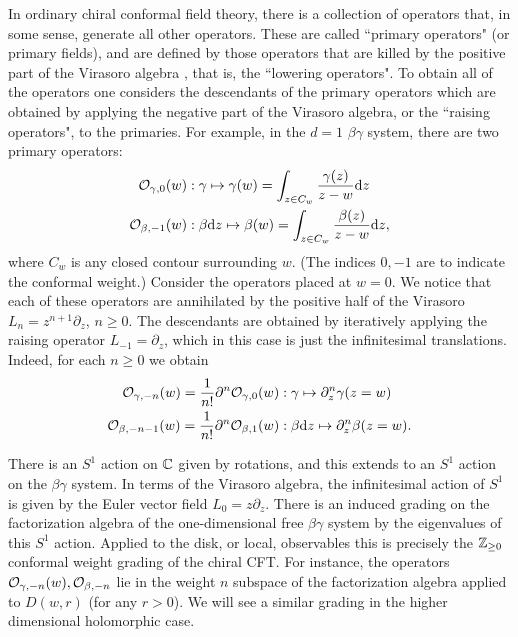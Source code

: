 \documentclass[10pt]{amsart}
\begin{document}
In ordinary chiral conformal field theory, there is a collection of operators that, in some sense, generate all other operators. 
These are called ``primary operators" (or primary fields), and are defined by those operators that are killed by the positive part of the Virasoro algebra \cite{polchinski}, that is, the ``lowering operators". 
To obtain all of the operators one considers the descendants of the primary operators which are obtained by applying the negative part of the Virasoro algebra, or the ``raising operators", to the primaries. 
For example, in the $d=1$ $\beta\gamma$ system, there are two primary operators:
\begin{align*}
\mathcal O_{\gamma,0} (w) & : \gamma \mapsto \gamma(w) = \int_{z \in C_w} \frac{\gamma(z)}{z-w} {\rm d} z  \\
\mathcal O_{\beta,-1} (w) & : \beta {\rm d} z \mapsto \beta(w) = \int_{z \in C_w} \frac{\beta(z)}{z-w} {\rm d} z ,
\end{align*}
where $C_w$ is any closed contour surrounding $w$. 
(The indices $0,-1$ are to indicate the conformal weight.)
Consider the operators placed at $w=0$.
We notice that each of these operators are annihilated by the positive half of the Virasoro $L_n = z^{n+1} \partial_z$, $n \geq 0$.
The descendants are obtained by iteratively applying the raising operator $L_{-1} = \partial_z$, which in this case is just the infinitesimal translations. 
Indeed, for each $n \geq 0$ we obtain
\begin{align*}
\mathcal O_{\gamma,-n}(w) = \frac{1}{n!} \partial^n \mathcal O_{\gamma,0}(w) & : \gamma \mapsto \partial_z^n \gamma(z = w) \\
\mathcal O_{\beta,-n-1}(w) = \frac{1}{n!} \partial^n \mathcal O_{\beta,1}(w) & : \beta {\rm d} z \mapsto \partial_z^n \beta(z=w) .
\end{align*}

There is an $S^1$ action on $\mathbb C$ given by rotations, and this extends to an $S^1$ action on the $\beta\gamma$ system.
In terms of the Virasoro algebra, the infinitesimal action of $S^1$ is given by the Euler vector field $L_0 = z \partial_z$. 
There is an induced grading on the factorization algebra of the one-dimensional free $\beta\gamma$ system by the eigenvalues of this $S^1$ action.
Applied to the disk, or local, observables this is precisely the $\mathbb Z_{\geq 0}$ conformal weight grading of the chiral CFT.
For instance, the operators $\mathcal O_{\gamma,-n}(w), \mathcal O_{\beta, -n}$ lie in the weight $n$ subspace of the factorization algebra applied to $D(w,r)$ (for any $r >0$). 
We will see a similar grading in the higher dimensional holomorphic case.
\end{document}
